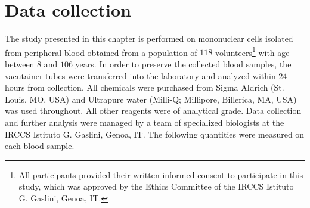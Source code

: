 \section{Data collection} \label{sec:frassoni_data_collection}

The study presented in this chapter is performed on mononuclear cells isolated from peripheral blood obtained from a population of $118$ volunteers\footnote{ All participants provided their written informed consent to participate in this study, which was approved by the Ethics Committee of the IRCCS Istituto G. Gaslini, Genoa, IT.} with age between $8$ and $106$ years.
In order to preserve the collected blood samples, the vacutainer tubes were transferred into the laboratory and analyzed within $24$ hours from collection.
All chemicals were purchased from Sigma Aldrich (St. Louis, MO, USA) and Ultrapure water (Milli-Q; Millipore, Billerica, MA, USA) was used throughout. All other reagents were of analytical grade.
Data collection and further analysis were managed by a team of specialized biologists at the IRCCS Istituto G. Gaslini, Genoa, IT. The following quantities were measured on each blood sample.

